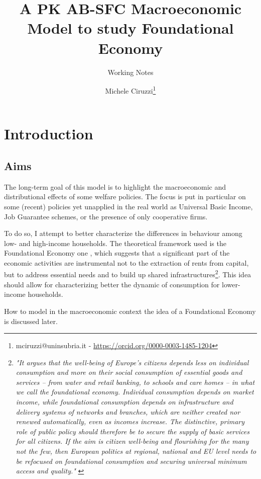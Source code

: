 \documentclass[a4paper, headings=standardclasses]{scrartcl}
\title{A PK AB-SFC Macroeconomic Model to study Foundational Economy\let\thefootnote\relax\footnotetext{
	An updated version of this paper and all the source code and the instructions required to replicate the paper are available at \url{https://github.com/TnTo/FE/}

	\hl{Highlighted} parts of the text indicate substantial choices to be taken.
  }}
\subtitle{Working Notes}
\author{Michele Ciruzzi\thanks{mciruzzi@uninsubria.it - \url{https://orcid.org/0000-0003-1485-1204}}}
\begin{document}
\maketitle


\section{Introduction}
\subsection{Aims}
The long-term goal of this model is to highlight the macroeconomic and distributional effects of some welfare policies.
The focus is put in particular on some (recent) policies yet unapplied in the real world as Universal Basic Income, Job Guarantee schemes, or the presence of only cooperative firms.

To do so, I attempt to better characterize the differences in behaviour among low- and high-income households.
The theoretical framework used is the Foundational Economy one \parencite{arcidiacono2018}, which suggests that a significant part of the economic activities are instrumental not to the extraction of rents from capital, but to address essential needs and to build up shared infrastructures\footnote{\textit{"It argues that the well-being of Europe's citizens depends less on individual consumption and more on their social consumption of essential goods and services – from water and retail banking, to schools and care homes – in what we call the foundational economy. Individual consumption depends on market income, while foundational consumption depends on infrastructure and delivery systems of networks and branches, which are neither created nor renewed automatically, even as incomes increase. The distinctive, primary role of public policy should therefore be to secure the supply of basic services for all citizens. If the aim is citizen well-being and flourishing for the many not the few, then European politics at regional, national and EU level needs to be refocused on foundational consumption and securing universal minimum access and quality."} \parencite{arcidiacono2018}}.
This idea should allow for characterizing better the dynamic of consumption for lower-income households.

How to model in the macroeconomic context the idea of a Foundational Economy is discussed later.
\end{document}
